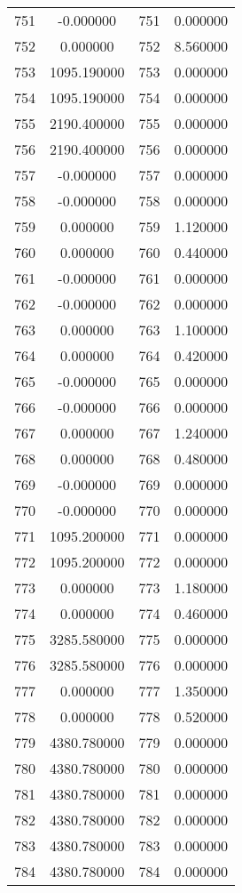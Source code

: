 \documentclass[12pt]{article}
\begin{document}
\begin{longtable}{@{}cccc@{}}
751 & -0.000000 & 751 & 0.000000 \\
752 & 0.000000 & 752 & 8.560000 \\
753 & 1095.190000 & 753 & 0.000000 \\
754 & 1095.190000 & 754 & 0.000000 \\
755 & 2190.400000 & 755 & 0.000000 \\
756 & 2190.400000 & 756 & 0.000000 \\
757 & -0.000000 & 757 & 0.000000 \\
758 & -0.000000 & 758 & 0.000000 \\
759 & 0.000000 & 759 & 1.120000 \\
760 & 0.000000 & 760 & 0.440000 \\
761 & -0.000000 & 761 & 0.000000 \\
762 & -0.000000 & 762 & 0.000000 \\
763 & 0.000000 & 763 & 1.100000 \\
764 & 0.000000 & 764 & 0.420000 \\
765 & -0.000000 & 765 & 0.000000 \\
766 & -0.000000 & 766 & 0.000000 \\
767 & 0.000000 & 767 & 1.240000 \\
768 & 0.000000 & 768 & 0.480000 \\
769 & -0.000000 & 769 & 0.000000 \\
770 & -0.000000 & 770 & 0.000000 \\
771 & 1095.200000 & 771 & 0.000000 \\
772 & 1095.200000 & 772 & 0.000000 \\
773 & 0.000000 & 773 & 1.180000 \\
774 & 0.000000 & 774 & 0.460000 \\
775 & 3285.580000 & 775 & 0.000000 \\
776 & 3285.580000 & 776 & 0.000000 \\
777 & 0.000000 & 777 & 1.350000 \\
778 & 0.000000 & 778 & 0.520000 \\
779 & 4380.780000 & 779 & 0.000000 \\
780 & 4380.780000 & 780 & 0.000000 \\
781 & 4380.780000 & 781 & 0.000000 \\
782 & 4380.780000 & 782 & 0.000000 \\
783 & 4380.780000 & 783 & 0.000000 \\
784 & 4380.780000 & 784 & 0.000000 \\

\end{longtable}
\end{document}
